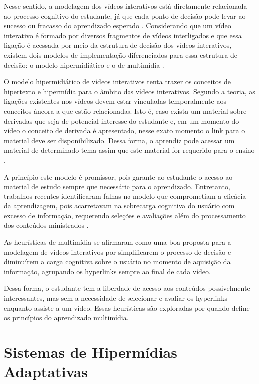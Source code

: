 Nesse sentido, a modelagem dos vídeos interativos está diretamente relacionada ao processo cognitivo do estudante, já que cada ponto de decisão pode levar ao sucesso ou fracasso do aprendizado esperado \cite{mayer2001,moreno2000}. Considerando que um vídeo interativo é formado por diversos fragmentos de vídeos interligados e que essa ligação é acessada por meio da estrutura de decisão dos vídeos interativos, existem dois modelos de implementação diferenciados para essa estrutura de decisão: o modelo hipermidiático e o de multimídia \cite{wetzel1994} .

O modelo hipermidiático de vídeos interativos tenta trazer os conceitos de hipertexto e hipermídia para o âmbito dos vídeos interativos. Segundo a teoria, as ligações existentes nos vídeos devem estar vinculadas temporalmente aos conceitos âncora a que estão relacionadas. Isto é, caso exista um material sobre derivadas que seja de potencial interesse do estudante e, em um momento do vídeo o conceito de derivada é apresentado, nesse exato momento o link para o material deve ser disponibilizado. Dessa forma, o aprendiz pode acessar um material de determinado tema assim que este material for requerido para o ensino \cite{wetzel1994}.

A princípio este modelo é promissor, pois garante ao estudante o acesso ao material de estudo sempre que necessário para o aprendizado. Entretanto, trabalhos recentes identificaram falhas no modelo que comprometiam a eficácia da aprendizagem, pois acarretavam na sobrecarga cognitiva do usuário com excesso de informação, requerendo seleções e avaliações além do processamento dos conteúdos ministrados \cite{zhang2005}.

As heurísticas de multimídia se afirmaram como uma boa proposta para a modelagem de vídeos interativos por simplificarem o processo de decisão e diminuírem a carga cognitiva sobre o usuário no momento de aquisição da informação, agrupando os  hyperlinks sempre ao final de cada vídeo. 

Dessa forma, o estudante tem a liberdade de acesso aos conteúdos possivelmente interessantes, mas sem a necessidade de selecionar e avaliar os hyperlinks enquanto assiste a um vídeo. Essas heurísticas são exploradas por  quando define os princípios do aprendizado multimídia.


\section{Sistemas de Hipermídias Adaptativas}

